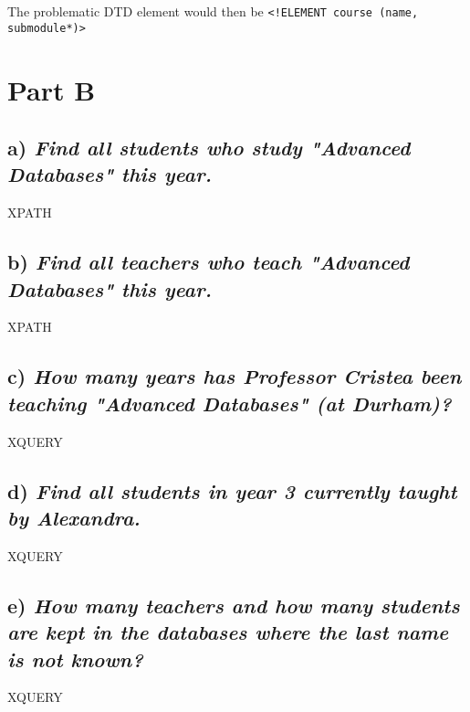 \documentclass[11pt]{article} %
\begin{document}
The problematic DTD element would then be \verb|<!ELEMENT course (name, submodule*)>|

\section*{Part B}

\subsection*{a) \textit{Find all students who study "Advanced Databases" this year.}}

XPATH

\subsection*{b) \textit{Find all teachers who teach "Advanced Databases" this year.}}

XPATH

\subsection*{c) \textit{How many years has Professor Cristea been teaching "Advanced Databases" (at Durham)?}}

XQUERY

\subsection*{d) \textit{Find all students in year 3 currently taught by Alexandra.}}

XQUERY

\subsection*{e) \textit{How many teachers and how many students are kept in the databases where the last name is not known?}}

XQUERY
\end{document}
